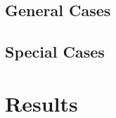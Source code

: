 \documentclass[a4paper,11pt,oneside]{article}
\begin{document}
    \subsection{General Cases}
    \subsection{Special Cases}

  \section{Results}


  \newpage
\end{document}
